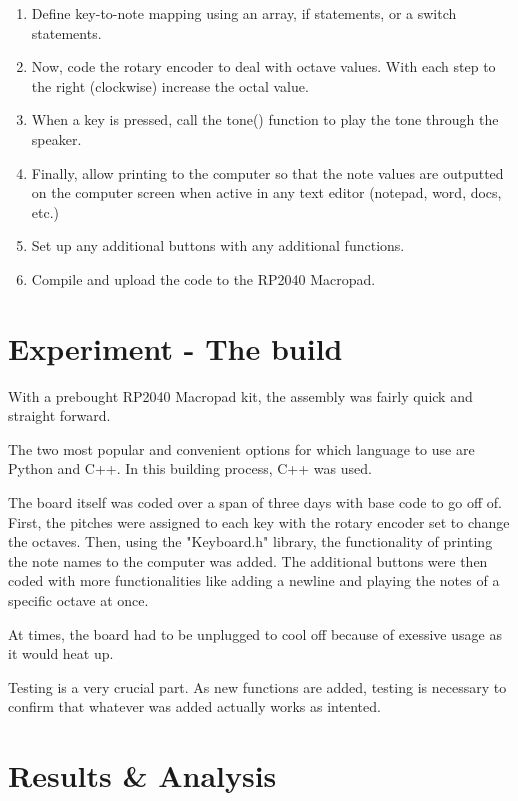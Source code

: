 \documentclass{article}
\begin{document}
\begin{enumerate}
    \item Define key-to-note mapping using an array, if statements, or a switch statements.

    \item Now, code the rotary encoder to deal with octave values. With each step to the right (clockwise) increase the octal value.
    
    \item When a key is pressed, call the tone() function to play the tone through the speaker. 

    \item Finally, allow printing to the computer so that the note values are outputted on the computer screen when active in any text editor (notepad, word, docs, etc.)

    \item Set up any additional buttons with any additional functions. 

    \item Compile and upload the code to the RP2040 Macropad. 
        
   
\end{enumerate}

\section{Experiment - The build}

With a prebought RP2040 Macropad kit, the assembly was fairly quick and straight forward.

The two most popular and convenient options for which language to use are Python and C++. In this building process, C++ was used.

The board itself was coded over a span of three days with base code to go off of. First, the pitches were assigned to each key with the rotary encoder set to change the octaves. Then, using the "Keyboard.h" library, the functionality of printing the note names to the computer was added. The additional buttons were then coded with more functionalities like adding a newline and playing the notes of a specific octave at once. 

At times, the board had to be unplugged to cool off because of exessive usage as it would heat up.

Testing is a very crucial part. As new functions are added, testing is necessary to confirm that whatever was added actually works as intented. 

\section{Results \& Analysis}
\end{document}

